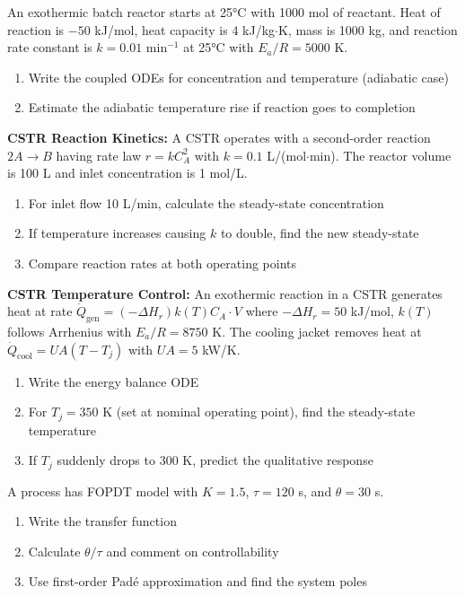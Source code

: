 \begin{exercise}
An exothermic batch reactor starts at 25°C with 1000 mol of reactant. Heat of reaction is $-50$ kJ/mol, heat capacity is 4 kJ/kg$\cdot$K, mass is 1000 kg, and reaction rate constant is $k = 0.01$ min$^{-1}$ at 25°C with $E_a/R = 5000$ K.
\begin{enumerate}[label=(\alph*)]
    \item Write the coupled ODEs for concentration and temperature (adiabatic case)
    \item Estimate the adiabatic temperature rise if reaction goes to completion
\end{enumerate}
\end{exercise}

\begin{exercise}
\textbf{CSTR Reaction Kinetics:} A CSTR operates with a second-order reaction $2A \to B$ having rate law $r = kC_A^2$ with $k = 0.1$ L/(mol$\cdot$min). The reactor volume is 100 L and inlet concentration is 1 mol/L.
\begin{enumerate}[label=(\alph*)]
    \item For inlet flow 10 L/min, calculate the steady-state concentration
    \item If temperature increases causing $k$ to double, find the new steady-state
    \item Compare reaction rates at both operating points
\end{enumerate}
\end{exercise}

\begin{exercise}
\textbf{CSTR Temperature Control:} An exothermic reaction in a CSTR generates heat at rate $\dot{Q}_{\text{gen}} = (-\Delta H_r)k(T)C_A \cdot V$ where $-\Delta H_r = 50$ kJ/mol, $k(T)$ follows Arrhenius with $E_a/R = 8750$ K. The cooling jacket removes heat at $\dot{Q}_{\text{cool}} = UA(T - T_j)$ with $UA = 5$ kW/K.
\begin{enumerate}[label=(\alph*)]
    \item Write the energy balance ODE
    \item For $T_j = 350$ K (set at nominal operating point), find the steady-state temperature
    \item If $T_j$ suddenly drops to 300 K, predict the qualitative response
\end{enumerate}
\end{exercise}

\begin{exercise}
A process has FOPDT model with $K = 1.5$, $\tau = 120$ s, and $\theta = 30$ s.
\begin{enumerate}[label=(\alph*)]
    \item Write the transfer function
    \item Calculate $\theta/\tau$ and comment on controllability
    \item Use first-order Padé approximation and find the system poles
\end{enumerate}
\end{exercise}

